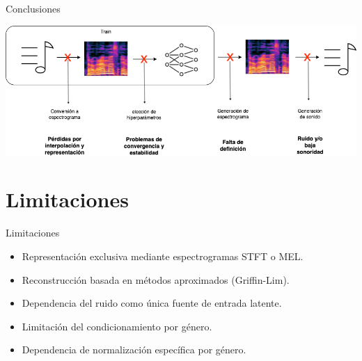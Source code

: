 \documentclass{beamer}
\newcommand{\currentsectionindex}{0}
\begin{document}
\begin{frame}{Conclusiones}
  \vspace{0.45cm}
  \begin{center}
  \includegraphics[width=1\textwidth]{images/conversion-fails-4.png}
  \end{center}
\end{frame}





\renewcommand{\currentsectionindex}{7}
\section{Limitaciones}
\begin{frame}{Limitaciones}
  \begin{itemize}
    \item Representación exclusiva mediante espectrogramas STFT o MEL.
    \item Reconstrucción basada en métodos aproximados (Griffin-Lim).
    \item Dependencia del ruido como única fuente de entrada latente.
    \item Limitación del condicionamiento por género.
    \item Dependencia de normalización específica por género.
\end{itemize}
\end{frame}
\end{document}
